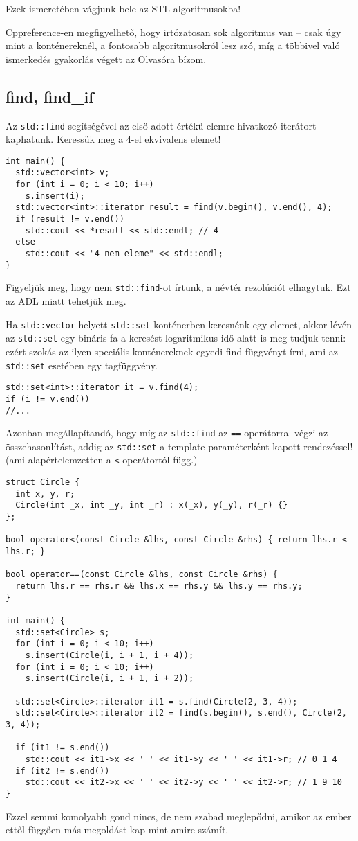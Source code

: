 \documentclass[../cpp_book/cpp_book.tex]{subfiles}
\begin{document}
	Ezek ismeretében vágjunk bele az STL algoritmusokba!
	\begin{note}
		Cppreference-en megfigyelhető, hogy irtózatosan sok algoritmus van -- csak úgy mint a konténereknél, a fontosabb algoritmusokról lesz szó, míg a többivel való ismerkedés gyakorlás végett az Olvasóra bízom.
	\end{note}
	\subsection{find, find\_if}
	Az \texttt{std::find} segítségével az első adott értékű elemre hivatkozó iterátort kaphatunk. Keressük meg a 4-el ekvivalens elemet!
	\begin{lstlisting}
int main() {
  std::vector<int> v;
  for (int i = 0; i < 10; i++)
    s.insert(i);
  std::vector<int>::iterator result = find(v.begin(), v.end(), 4);
  if (result != v.end())
    std::cout << *result << std::endl; // 4
  else
    std::cout << "4 nem eleme" << std::endl;
}
	\end{lstlisting}
	\begin{note}
		Figyeljük meg, hogy nem \texttt{std::find}-ot írtunk, a névtér rezolúciót elhagytuk. Ezt az ADL miatt tehetjük meg.
	\end{note}
	Ha \texttt{std::vector} helyett \texttt{std::set} konténerben keresnénk egy elemet, akkor lévén az \texttt{std::set} egy bináris fa a keresést logaritmikus idő alatt is meg tudjuk tenni: ezért szokás az ilyen speciális konténereknek egyedi find függvényt írni, ami az \texttt{std::set} esetében egy tagfüggvény. 
	\begin{lstlisting}
std::set<int>::iterator it = v.find(4);
if (i != v.end())
//...
	\end{lstlisting}
	Azonban megállapítandó, hogy míg az \texttt{std::find} az \texttt{==} operátorral végzi az összehasonlítást, addig az \texttt{std::set} a template paraméterként kapott rendezéssel! (ami alapértelemzetten a \texttt{<} operátortól függ.)
\begin{lstlisting}
struct Circle {
  int x, y, r;
  Circle(int _x, int _y, int _r) : x(_x), y(_y), r(_r) {}
};

bool operator<(const Circle &lhs, const Circle &rhs) { return lhs.r < lhs.r; }

bool operator==(const Circle &lhs, const Circle &rhs) {
  return lhs.r == rhs.r && lhs.x == rhs.y && lhs.y == rhs.y;
}

int main() {
  std::set<Circle> s;
  for (int i = 0; i < 10; i++)
    s.insert(Circle(i, i + 1, i + 4));
  for (int i = 0; i < 10; i++)
    s.insert(Circle(i, i + 1, i + 2));

  std::set<Circle>::iterator it1 = s.find(Circle(2, 3, 4));
  std::set<Circle>::iterator it2 = find(s.begin(), s.end(), Circle(2, 3, 4));

  if (it1 != s.end())
    std::cout << it1->x << ' ' << it1->y << ' ' << it1->r; // 0 1 4
  if (it2 != s.end())
    std::cout << it2->x << ' ' << it2->y << ' ' << it2->r; // 1 9 10
}
\end{lstlisting}
	Ezzel semmi komolyabb gond nincs, de nem szabad meglepődni, amikor az ember ettől függően más megoldást kap mint amire számít.
	
\end{document}
